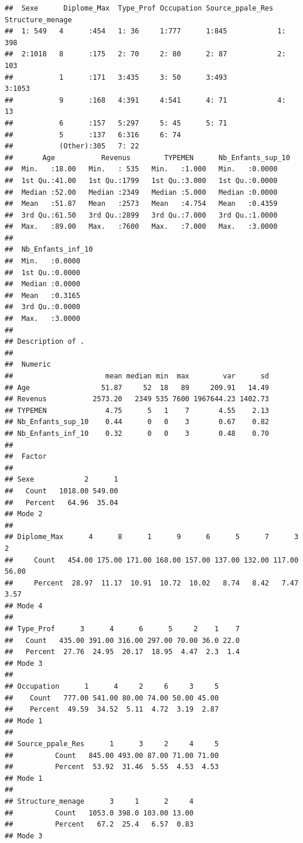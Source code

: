 \documentclass[11pt,a4paper, x11names]{article}\usepackage[]{graphicx}\usepackage[]{color}
\makeatletter
\newenvironment{kframe}{%
 \def\at@end@of@kframe{}%
 \ifinner\ifhmode%
  \def\at@end@of@kframe{\end{minipage}}%
  \begin{minipage}{\columnwidth}%
 \fi\fi%
 \def\FrameCommand##1{\hskip\@totalleftmargin \hskip-\fboxsep
 \colorbox{shadecolor}{##1}\hskip-\fboxsep
     \hskip-\linewidth \hskip-\@totalleftmargin \hskip\columnwidth}%
 \MakeFramed {\advance\hsize-\width
   \@totalleftmargin\z@ \linewidth\hsize
   \@setminipage}}%
 {\par\unskip\endMakeFramed%
 \at@end@of@kframe}
\newenvironment{knitrout}{}{} %
\makeatother
\begin{document}
\begin{knitrout}
\color{fgcolor}\begin{kframe}
\begin{verbatim}
##  Sexe      Diplome_Max  Type_Prof Occupation Source_ppale_Res Structure_menage
##  1: 549   4      :454   1: 36     1:777      1:845            1: 398          
##  2:1018   8      :175   2: 70     2: 80      2: 87            2: 103          
##           1      :171   3:435     3: 50      3:493            3:1053          
##           9      :168   4:391     4:541      4: 71            4:  13          
##           6      :157   5:297     5: 45      5: 71                            
##           5      :137   6:316     6: 74                                       
##           (Other):305   7: 22                                                 
##       Age           Revenus        TYPEMEN      Nb_Enfants_sup_10
##  Min.   :18.00   Min.   : 535   Min.   :1.000   Min.   :0.0000   
##  1st Qu.:41.00   1st Qu.:1799   1st Qu.:3.000   1st Qu.:0.0000   
##  Median :52.00   Median :2349   Median :5.000   Median :0.0000   
##  Mean   :51.87   Mean   :2573   Mean   :4.754   Mean   :0.4359   
##  3rd Qu.:61.50   3rd Qu.:2899   3rd Qu.:7.000   3rd Qu.:1.0000   
##  Max.   :89.00   Max.   :7600   Max.   :7.000   Max.   :3.0000   
##                                                                  
##  Nb_Enfants_inf_10
##  Min.   :0.0000   
##  1st Qu.:0.0000   
##  Median :0.0000   
##  Mean   :0.3165   
##  3rd Qu.:0.0000   
##  Max.   :3.0000   
## 
## Description of .
## 
##  Numeric 
##                      mean median min  max        var      sd
## Age                 51.87     52  18   89     209.91   14.49
## Revenus           2573.20   2349 535 7600 1967644.23 1402.73
## TYPEMEN              4.75      5   1    7       4.55    2.13
## Nb_Enfants_sup_10    0.44      0   0    3       0.67    0.82
## Nb_Enfants_inf_10    0.32      0   0    3       0.48    0.70
## 
##  Factor 
##          
## Sexe            2      1
##   Count   1018.00 549.00
##   Percent   64.96  35.04
## Mode 2 
##            
## Diplome_Max      4      8      1      9      6      5      7      3     2
##     Count   454.00 175.00 171.00 168.00 157.00 137.00 132.00 117.00 56.00
##     Percent  28.97  11.17  10.91  10.72  10.02   8.74   8.42   7.47  3.57
## Mode 4 
##          
## Type_Prof      3      4      6      5     2    1    7
##   Count   435.00 391.00 316.00 297.00 70.00 36.0 22.0
##   Percent  27.76  24.95  20.17  18.95  4.47  2.3  1.4
## Mode 3 
##           
## Occupation      1      4     2     6     3     5
##    Count   777.00 541.00 80.00 74.00 50.00 45.00
##    Percent  49.59  34.52  5.11  4.72  3.19  2.87
## Mode 1 
##                 
## Source_ppale_Res      1      3     2     4     5
##          Count   845.00 493.00 87.00 71.00 71.00
##          Percent  53.92  31.46  5.55  4.53  4.53
## Mode 1 
##                 
## Structure_menage      3     1      2     4
##          Count   1053.0 398.0 103.00 13.00
##          Percent   67.2  25.4   6.57  0.83
## Mode 3
\end{verbatim}
\end{kframe}
\end{knitrout}
\end{document}
